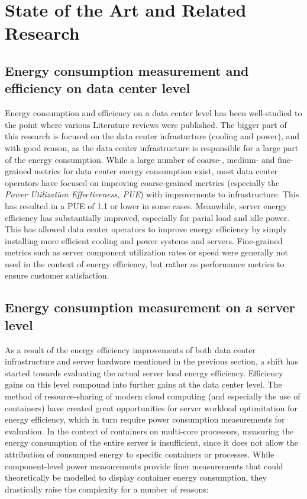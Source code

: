 \chapter{State of the Art and Related Research} %
\label{Chapter2}

\section{Energy consumption measurement and efficiency on data center level}

Energy consumption and efficiency on a data center level has been well-studied to the point where various Literature reviews were published\parencite{long2022review}\parencite{jin2020review}. The bigger part of this research is focused on the data center infrasturture (cooling and power), and with good reason, as the data center infrastructure is responsible for a large part of the energy consumption. While a large number of coarse-, medium- and fine-grained metrics for data center energy consumption exist, most data center operators have focused on improving coarse-grained mertrics (especially the \textit{Power Utilization Effectiveness, PUE}) with improvements to infrastructure. This has resulted in a PUE of 1.1 or lower in some cases\parencite{uptime2023pue}. Meanwhile, server energy efficiency has substantially improved, especially for parial load and idle power\parencite{tropgen202416}. This has allowed data center operators to improve energy efficiency by simply installing more efficient cooling and power systems and servers. Fine-grained metrics such as server component utilization rates or speed were generally not used in the context of energy efficiency, but rather as performance metrics to ensure customer satisfaction.

\section{Energy consumption measurement on a server level}

As a result of the energy efficiency improvements of both data center infrastructure and server hardware mentioned in the previous section, a shift has started towards evaluating the actual server load energy efficiency. Efficiency gains on this level compound into further gains at the data center level. The  method of resource-sharing of modern cloud computing (and especially the use of containers) have created great opportunities for server workload optimitation for energy efficiency, which in turn require power consumption measurements for evaluation. In the context of containers on multi-core processors, measuring the energy consumption of the entire server is insufficient, since it does not allow the attribution of consumped energy to specific containers or processes. While component-level power measurements provide finer measurements that could theoretically be modelled to display container energy consumption, they drastically raise the complexity for a number of reasons:

